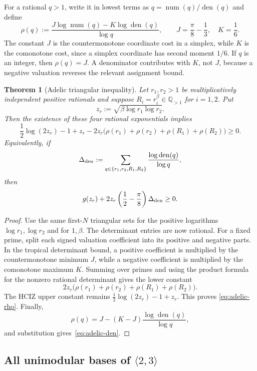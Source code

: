 \documentclass[11pt,oneside]{article}
\newtheorem{theorem}{Theorem}[section]
\theoremstyle{definition}
\theoremstyle{remark}
\newcommand{\Q}{\mathbb Q}
\newcommand{\num}{\operatorname{num}}
\newcommand{\den}{\operatorname{den}}
\begin{document}
For a rational $q>1$, write it in lowest terms as
$q=\num(q)/\den(q)$ and define
\begin{equation}\label{eq:rho}
 \rho(q):=
 \frac{J\log\num(q)-K\log\den(q)}{\log q},
 \qquad
 J=\frac\pi8-\frac13,\quad K=\frac16.
\end{equation}
The constant $J$ is the countermonotone coordinate cost in a simplex, while
$K$ is the comonotone cost, since a simplex coordinate has second moment
$1/6$.  If $q$ is an integer, then $\rho(q)=J$.  A denominator contributes with
$K$, not $J$, because a negative valuation reverses the relevant assignment
bound.

\begin{theorem}[Adelic triangular inequality]\label{thm:adelic-triangle}
Let $r_1,r_2>1$ be multiplicatively independent positive rationals and suppose
$R_i=r_i^\beta\in\Q_{>1}$ for $i=1,2$.  Put
\[
 z_r:=\sqrt{\beta\log r_1\log r_2}.
\]
Then the existence of these four rational exponentials implies
\begin{equation}\label{eq:adelic-rho}
 \frac12\log(2z_r)-1+z_r
 -2z_r\bigl(\rho(r_1)+\rho(r_2)+\rho(R_1)+\rho(R_2)\bigr)\ge0.
\end{equation}
Equivalently, if
\[
 \Delta_{\rm den}:=
 \sum_{q\in\{r_1,r_2,R_1,R_2\}}
 \frac{\log\den(q)}{\log q},
\]
then
\begin{equation}\label{eq:adelic-den}
 g(z_r)+2z_r\left(\frac12-\frac\pi8\right)\Delta_{\rm den}\ge0.
\end{equation}
\end{theorem}
\begin{proof}
Use the same first-$N$ triangular sets for the positive logarithms
$\log r_1,\log r_2$ and for $1,\beta$.  The determinant entries are now
rational.  For a fixed prime, split each signed valuation coefficient into its
positive and negative parts.  In the tropical determinant bound, a positive
coefficient is multiplied by the countermonotone minimum $J$, while a negative
coefficient is multiplied by the comonotone maximum $K$.  Summing over primes
and using the product formula for the nonzero rational determinant gives the
lower constant
\[
 2z_r\bigl(\rho(r_1)+\rho(r_2)+\rho(R_1)+\rho(R_2)\bigr).
\]
The HCIZ upper constant remains $\tfrac12\log(2z_r)-1+z_r$.  This proves
\eqref{eq:adelic-rho}.  Finally,
\[
 \rho(q)=J-(K-J)\frac{\log\den(q)}{\log q},
\]
and substitution gives~\eqref{eq:adelic-den}.
\end{proof}

\subsection{All unimodular bases of $\langle2,3\rangle$}
\end{document}
